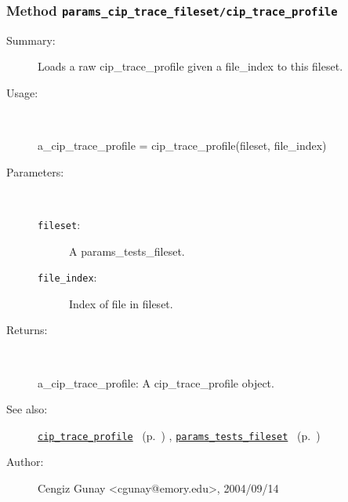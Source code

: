 \subsubsection[Method \texttt{cip\_trace\_profile}]{Method \texttt{params\_cip\_trace\_fileset/cip\_trace\_profile}}%
%
\label{ref_params_cip_trace_fileset__cip_trace_profile}%
\hypertarget{ref_params_cip_trace_fileset__cip_trace_profile}{}%
\begin{description}
\item[Summary:]Loads a raw cip\_trace\_profile given a file\_index 
		      to this fileset.
%
\item[Usage:]~%
\begin{lyxcode}%
a\_cip\_trace\_profile = cip\_trace\_profile(fileset, file\_index)
%
\end{lyxcode}%
%
%
\item[Parameters:]~
\begin{description}%
\item[\texttt{fileset}:]
 A params\_tests\_fileset.
\item[\texttt{file\_index}:]
 Index of file in fileset.
\end{description}%
%
\item[Returns:]~

	a\_cip\_trace\_profile: A cip\_trace\_profile object.
%
%
\item[See also:]%
\hyperlink{ref_cip_trace_profile}{\texttt{cip\_trace\_profile}}%
\ (p.~\pageref{ref_cip_trace_profile})%
%
, \hyperlink{ref_params_tests_fileset}{\texttt{params\_tests\_fileset}}%
\ (p.~\pageref{ref_params_tests_fileset})%
%
%
\item[Author:]%
Cengiz Gunay <cgunay@emory.edu>, 2004/09/14%
\end{description}
\methodline%
